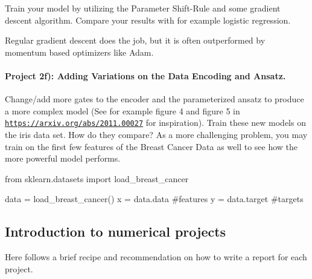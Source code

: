 \documentclass[%
oneside,                 %
final,                   %
10pt]{article}
\begin{document}
Train your model by utilizing the Parameter Shift-Rule and some
gradient descent algorithm. Compare your results with for example
logistic regression.

Regular gradient descent does the job, but it is often outperformed by momentum based optimizers like Adam.


\paragraph{Project 2f): Adding Variations on the Data Encoding and Ansatz.}
Change/add more gates to the encoder and the parameterized ansatz to produce a more complex model (See for example figure 4 and figure 5 in \href{{https://arxiv.org/abs/2011.00027}}{\nolinkurl{https://arxiv.org/abs/2011.00027}} for inspiration). Train these new models on the iris data set. How do they compare? As a more challenging problem, you may train on the first few features of the Breast Cancer Data as well to see how the more powerful model performs.

\begin{print}
from sklearn.datasets import load_breast_cancer

data = load_breast_cancer()
x = data.data #features
y = data.target #targets
\end{print}





\subsection*{Introduction to numerical projects}

Here follows a brief recipe and recommendation on how to write a report for each
project.
\end{document}
